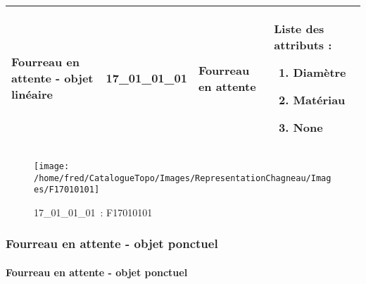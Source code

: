 \documentclass[12pt,titlepage,oneside]{book}
\begin{document}
\renewcommand{\arraystretch}{1.2}
\begin{supertabular}{|p{10cm}|c|p{13cm}|p{12cm}|}
 Fourreau en attente - objet linéaire & 17\_01\_01\_01 & Fourreau en attente & Liste des attributs :
\begin{enumerate}
  \item Diamètre  \item Matériau  \item None\end{enumerate}
\\
\hline
\end{supertabular}
\begin{figure}[h!]
  \hfill         %
  \begin{minipage}[t]{3cm}
    \begin{center}
      \texttt{[image: /home/fred/CatalogueTopo/Images/RepresentationChagneau/Images/F17010101]}
      \caption[~17\_01\_01\_01]{\small{17\_01\_01\_01~:} \tiny{F17010101}}\label{F17010101}
    \end{center}
  \end{minipage}
\end{figure}

\subsubsection{\large Fourreau en attente - objet ponctuel}
\paragraph{Fourreau en attente - objet ponctuel}
\noindent
\vspace{\baselineskip}
\end{document}
